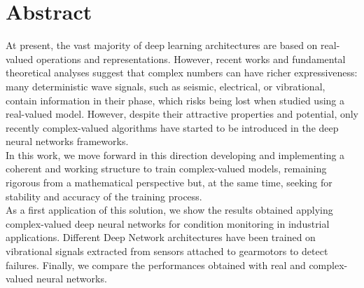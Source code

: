 \documentclass[../main.tex]{subfiles}
\begin{document}
	
\chapter*{Abstract}

At present, the vast majority of deep learning architectures are based on real-valued operations and representations. However, recent works and fundamental theoretical analyses suggest that complex numbers can have richer expressiveness: many deterministic wave signals, such as seismic, electrical, or vibrational, contain information in their phase, which risks being lost when studied using a real-valued model. However, despite their attractive properties and potential, only recently complex-valued algorithms have started to be introduced in the deep neural networks frameworks.\\
In this work, we move forward in this direction developing and implementing a coherent and working structure to train complex-valued models, remaining rigorous from a mathematical perspective but, at the same time, seeking for stability and accuracy of the training process.\\
As a first application of this solution, we show the results obtained applying complex-valued deep neural networks for condition monitoring in industrial applications. Different Deep Network architectures have been trained on vibrational signals extracted from sensors attached to gearmotors to detect failures. Finally, we compare the performances obtained with real and complex-valued neural networks.
\end{document}

